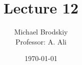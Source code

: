 


\title{Lecture 12}
\date{\today}
\author{Michael Brodskiy\\ \small Professor: A. Ali}



\maketitle

